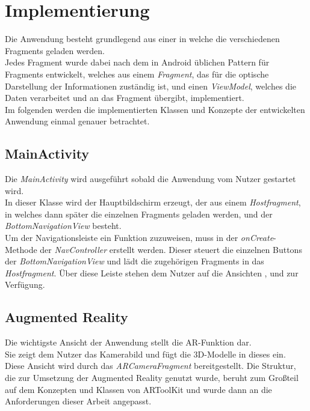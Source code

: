 \chapter{Implementierung}\label{chapter:implementierung}
Die Anwendung besteht grundlegend aus einer \textit{} in welche die verschiedenen Fragments geladen werden.\\
Jedes Fragment wurde dabei nach dem in Android üblichen Pattern für Fragments entwickelt, welches aus einem \textit{Fragment}, das für die optische Darstellung der Informationen zuständig ist, und einen \textit{ViewModel}, welches die Daten verarbeitet und an das Fragment übergibt, implementiert.\\
Im folgenden werden die implementierten Klassen und Konzepte der entwickelten Anwendung einmal genauer betrachtet.

\section{MainActivity}\label{class:mainactivity}
Die \textit{MainActivity} wird ausgeführt sobald die Anwendung vom Nutzer gestartet wird.\\
In dieser Klasse wird der Hauptbildschirm erzeugt, der aus einem \textit{Hostfragment}, in welches dann später die einzelnen Fragments geladen werden, und der \textit{BottomNavigationView} besteht. \\
Um der Navigationsleiste ein Funktion zuzuweisen, muss in der \textit{onCreate}-Methode der \textit{NavController} erstellt werden. Dieser steuert die einzelnen Buttons der \textit{BottomNavigationView} und lädt die zugehörigen Fragments in das \textit{Hostfragment}. Über diese Leiste stehen dem Nutzer auf die Ansichten ,  und  zur Verfügung.


\section{Augmented Reality}\label{impl:ar}
Die wichtigste Ansicht der Anwendung stellt die AR-Funktion dar. \\ 
Sie zeigt dem Nutzer das Kamerabild und fügt die 3D-Modelle in dieses ein.\\
Diese Ansicht wird durch das \textit{ARCameraFragment} bereitgestellt.
Die Struktur, die zur Umsetzung der Augmented Reality genutzt wurde, beruht zum Großteil auf dem Konzepten und Klassen von ARToolKit und wurde dann an die Anforderungen dieser Arbeit angepasst.

